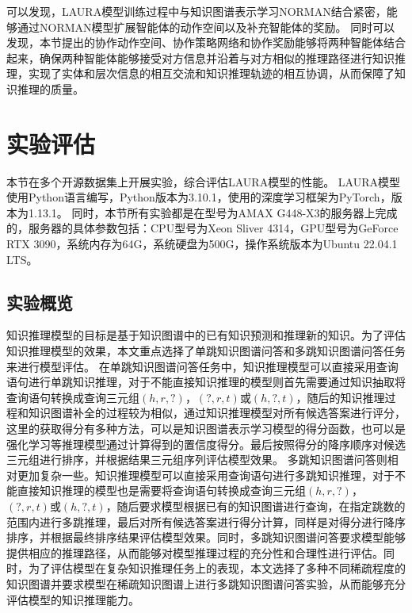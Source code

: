 \documentclass[algorithmlist, AutoFakeBold, AutoFakeSlant, figurelist, tablelist, nomlist, engineering]{seuthesix}
\begin{document}
可以发现，LAURA模型训练过程中与知识图谱表示学习NORMAN结合紧密，能够通过NORMAN模型扩展智能体的动作空间以及补充智能体的奖励。
同时可以发现，本节提出的协作动作空间、协作策略网络和协作奖励能够将两种智能体结合起来，确保两种智能体能够接受对方信息并沿着与对方相似的推理路径进行知识推理，实现了实体和层次信息的相互交流和知识推理轨迹的相互协调，从而保障了知识推理的质量。

\section{实验评估}
本节在多个开源数据集上开展实验，综合评估LAURA模型的性能。
LAURA模型使用Python语言编写，Python版本为3.10.1，使用的深度学习框架为PyTorch，版本为1.13.1。
同时，本节所有实验都是在型号为AMAX G448-X3的服务器上完成的，服务器的具体参数包括：CPU型号为Xeon Sliver 4314，GPU型号为GeForce RTX 3090，系统内存为64G，系统硬盘为500G，操作系统版本为Ubuntu 22.04.1 LTS。

\subsection{实验概览}
知识推理模型的目标是基于知识图谱中的已有知识预测和推理新的知识。为了评估知识推理模型的效果，本文重点选择了单跳知识图谱问答和多跳知识图谱问答任务来进行模型评估。
在单跳知识图谱问答任务中，知识推理模型可以直接采用查询语句进行单跳知识推理，对于不能直接知识推理的模型则首先需要通过知识抽取将查询语句转换成查询三元组$(h, r, ?)$，$(?, r, t)$或$(h, ?, t)$，随后的知识推理过程和知识图谱补全的过程较为相似，通过知识推理模型对所有候选答案进行评分，这里的获取得分有多种方法，可以是知识图谱表示学习模型的得分函数，也可以是强化学习等推理模型通过计算得到的置信度得分。最后按照得分的降序顺序对候选三元组进行排序，并根据结果三元组序列评估模型效果。
多跳知识图谱问答则相对更加复杂一些。知识推理模型可以直接采用查询语句进行多跳知识推理，对于不能直接知识推理的模型也是需要将查询语句转换成查询三元组$(h, r, ?)$，$(?, r, t)$或$(h, ?, t)$，随后要求模型根据已有的知识图谱进行查询，在指定跳数的范围内进行多跳推理，最后对所有候选答案进行得分计算，同样是对得分进行降序排序，并根据最终排序结果评估模型效果。同时，多跳知识图谱问答要求模型能够提供相应的推理路径，从而能够对模型推理过程的充分性和合理性进行评估。同时，为了评估模型在复杂知识推理任务上的表现，本文选择了多种不同稀疏程度的知识图谱并要求模型在稀疏知识图谱上进行多跳知识图谱问答实验，从而能够充分评估模型的知识推理能力。
\end{document}
